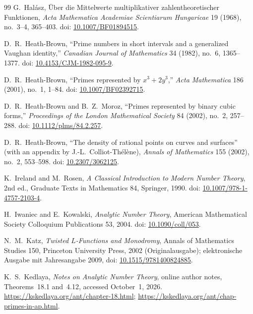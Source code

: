 \documentclass[11pt,a4paper]{article}
\begin{document}
\begin{thebibliography}{99}
G.~Halász, \glqq Über die Mittelwerte multiplikativer zahlentheoretischer Funktionen\grqq{},
\emph{Acta Mathematica Academiae Scientiarum Hungaricae} 19 (1968), no.\ 3--4, 365--403. doi:
\href{https://doi.org/10.1007/BF01894515}{10.1007/BF01894515}.

D.~R.~Heath-Brown, ``Prime numbers in short intervals and a generalized Vaughan identity,''
\emph{Canadian Journal of Mathematics} 34 (1982), no.\ 6, 1365--1377.
doi: \href{https://doi.org/10.4153/CJM-1982-095-9}{10.4153/CJM-1982-095-9}.

D.~R.~Heath-Brown, ``Primes represented by $x^3+2y^3$,''
\emph{Acta Mathematica} 186 (2001), no.\ 1, 1--84. doi:
\href{https://doi.org/10.1007/BF02392715}{10.1007/BF02392715}.

D.~R.~Heath-Brown and B.~Z.~Moroz, ``Primes represented by binary cubic forms,''
\emph{Proceedings of the London Mathematical Society} 84 (2002), no.\ 2, 257--288. doi:
\href{https://doi.org/10.1112/plms/84.2.257}{10.1112/plms/84.2.257}.

D.~R.~Heath-Brown, ``The density of rational points on curves and surfaces'' (with an appendix by J.-L.~Colliot-Thélène),
\emph{Annals of Mathematics} 155 (2002), no.\ 2, 553--598. doi:
\href{https://doi.org/10.2307/3062125}{10.2307/3062125}.

K.~Ireland and M.~Rosen, \emph{A Classical Introduction to Modern Number Theory}, 2nd ed., Graduate Texts in Mathematics 84, Springer, 1990.
doi: \href{https://doi.org/10.1007/978-1-4757-2103-4}{10.1007/978-1-4757-2103-4}.

H.~Iwaniec and E.~Kowalski, \emph{Analytic Number Theory},
American Mathematical Society Colloquium Publications 53, 2004. doi:
\href{https://doi.org/10.1090/coll/053}{10.1090/coll/053}.

N.~M.~Katz, \emph{Twisted $L$-Functions and Monodromy},
Annals of Mathematics Studies 150, Princeton University Press,
2002 (Originalausgabe); elektronische Ausgabe mit Jahresangabe 2009,
doi: \href{https://doi.org/10.1515/9781400824885}{10.1515/9781400824885}.

K.~S.~Kedlaya, \emph{Notes on Analytic Number Theory},
online author notes, Theorems~18.1 and~4.12, accessed October~1, 2026.
\url{https://kskedlaya.org/ant/chapter-18.html};
\url{https://kskedlaya.org/ant/chap-primes-in-ap.html}.


\end{thebibliography}
\end{document}

